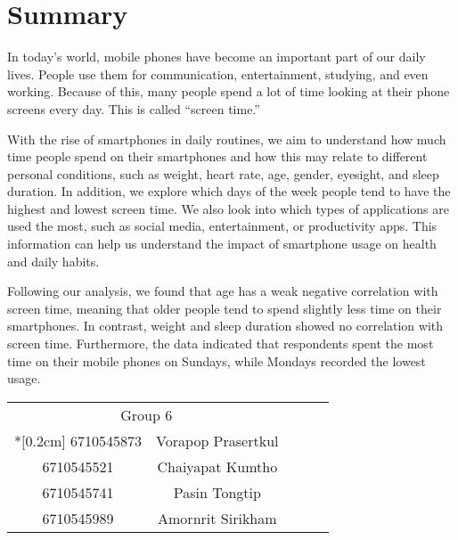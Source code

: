 \chapter*{Summary}
In today's world, mobile phones have become an important part of our daily lives. People use them for communication, entertainment, studying, and even working. Because of this, many people spend a lot of time looking at their phone screens every day. This is called ``screen time.''\\ \par
With the rise of smartphones in daily routines, we aim to understand how much time people spend on their smartphones and how this may relate to different personal conditions, such as weight, heart rate, age, gender, eyesight, and sleep duration. In addition, we explore which days of the week people tend to have the highest and lowest screen time. We also look into which types of applications are used the most, such as social media, entertainment, or productivity apps. This information can help us understand the impact of smartphone usage on health and daily habits.\\ \par
Following our analysis, we found that age has a weak negative correlation with screen time, meaning that older people tend to spend slightly less time on their smartphones. In contrast, weight and sleep duration showed no correlation with screen time. Furthermore, the data indicated that respondents spent the most time on their mobile phones on Sundays, while Mondays recorded the lowest usage.

\begin{flushright}
    \begin{tabular}{cclll}
        \multicolumn{2}{c}{Group 6}     &  &  &  \\*[0.2cm]
        6710545873 & Vorapop Prasertkul &  &  &  \\
        6710545521 & Chaiyapat Kumtho   &  &  &  \\
        6710545741 & Pasin Tongtip      &  &  &  \\
        6710545989 & Amornrit Sirikham  &  &  & 
    \end{tabular}
\end{flushright}